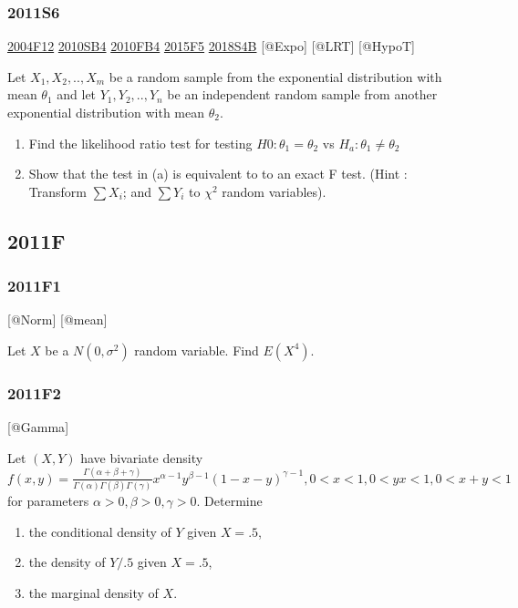 \documentclass[6pt,twocolumn,Portrait]{article}
\begin{document}
\hypertarget{s6-2}{%
\subsubsection{2011S6}\label{s6-2}}

\protect\hyperlink{f12}{2004F12} \protect\hyperlink{sb4}{2010SB4}
\protect\hyperlink{fb4-1}{2010FB4} \protect\hyperlink{f5-5}{2015F5}
\protect\hyperlink{s4b-2}{2018S4B} {[}@Expo{]} {[}@LRT{]} {[}@HypoT{]}

Let \(X_1,X_2,..,X_{m}\) be a random sample from the exponential
distribution with mean \(\theta_1\) and let \(Y_1,Y_2,..,Y_{n}\) be an
independent random sample from another exponential distribution with
mean \(\theta_2\).

\begin{enumerate}
\def\labelenumi{(\alph{enumi})}
\item
  Find the likelihood ratio test for testing \(H0:\theta_1=\theta_2\) vs
  \(H_a:\theta_1\neq\theta_2\)
\item
  Show that the test in (a) is equivalent to to an exact F test. (Hint :
  Transform \(\sum X_i\); and \(\sum Y_i\) to \(\chi^2\) random
  variables).
\end{enumerate}

\hypertarget{f-7}{%
\subsection{2011F}\label{f-7}}

\hypertarget{f1-4}{%
\subsubsection{2011F1}\label{f1-4}}

{[}@Norm{]} {[}@mean{]}

Let \(X\) be a \(N(0,\sigma^2)\) random variable. Find \(E(X^4)\).

\hypertarget{f2-4}{%
\subsubsection{2011F2}\label{f2-4}}

{[}@Gamma{]}

Let \((X,Y)\) have bivariate density
\(f(x,y)=\frac{\Gamma(\alpha+\beta+\gamma)}{\Gamma(\alpha)\Gamma(\beta)\Gamma(\gamma)}x^{\alpha-1}y^{\beta-1}(1-x-y)^{\gamma-1},0<x<1,0<yx<1,0<x+y<1\)
for parameters \(\alpha>0,\beta>0,\gamma>0\). Determine

\begin{enumerate}
\def\labelenumi{(\alph{enumi})}
\item
  the conditional density of \(Y\) given \(X=.5\),
\item
  the density of \(Y/.5\) given \(X=.5\),
\item
  the marginal density of \(X\).
\end{enumerate}
\end{document}
